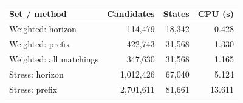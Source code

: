 \begin{tabular}{lrrr}
\toprule Set / method & Candidates & States & CPU (s) \\
\midrule
Weighted: horizon & 114,479 & 18,342 & 0.428 \\
Weighted: prefix & 422,743 & 31,568 & 1.330 \\
Weighted: all matchings & 347,630 & 31,568 & 1.165 \\
\midrule
Stress: horizon & 1,012,426 & 67,040 & 5.124 \\
Stress: prefix & 2,701,611 & 81,661 & 13.611 \\
\bottomrule
\end{tabular}

